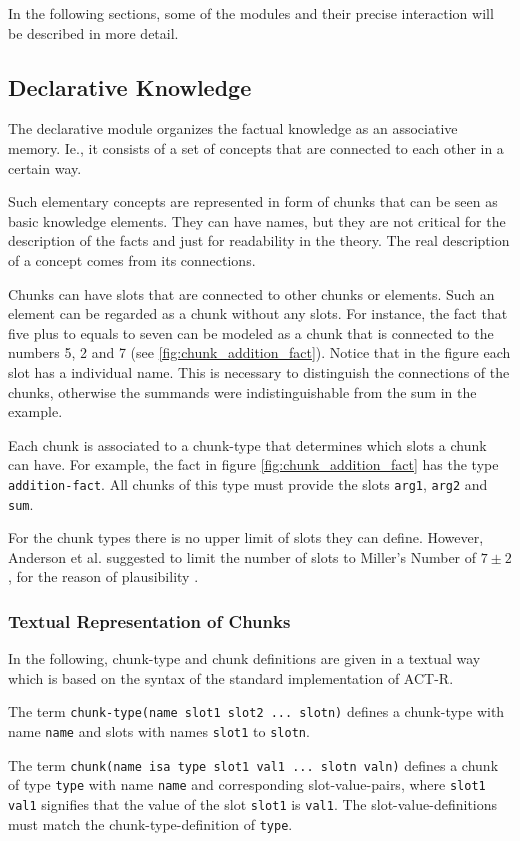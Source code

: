 In the following sections, some of the modules and their precise interaction will be described in more detail.

\subsection{Declarative Knowledge}

The declarative module organizes the factual knowledge as an associative memory. Ie., it consists of a set of concepts that are connected to each other in a certain way.

Such elementary concepts are represented in form of chunks that can be seen as basic knowledge elements. They can have names, but they are not critical for the description of the facts and just for readability in the theory. The real description of a concept comes from its connections.

Chunks can have slots that are connected to other chunks or elements. Such an element can be regarded as a chunk without any slots. For instance, the fact that five plus to equals to seven can be modeled as a chunk that is connected to the numbers 5, 2 and 7 (see \ref{fig:chunk_addition_fact}). Notice that in the figure each slot has a individual name. This is necessary to distinguish the connections of the chunks, otherwise the summands were indistinguishable from the sum in the example.

Each chunk is associated to a chunk-type that determines which slots a chunk can have. For example, the fact in figure \ref{fig:chunk_addition_fact} has the type \verb|addition-fact|. All chunks of this type must provide the slots \verb|arg1|, \verb|arg2| and \verb|sum|.

For the chunk types there is no upper limit of slots they can define. However, Anderson et al. suggested to limit the number of slots to Miller's Number of $7 \pm 2$, for the reason of plausibility \cite{unknown}. 

\subsubsection{Textual Representation of Chunks}

In the following, chunk-type and chunk definitions are given in a textual way which is based on the syntax of the standard implementation of ACT-R.

\begin{definition}
The term \verb|chunk-type(name slot1 slot2 ... slotn)| defines a chunk-type with name \verb|name| and slots with names \verb|slot1| to \verb|slotn|.

The term \verb|chunk(name isa type slot1 val1 ... slotn valn)| defines a chunk of type \verb|type| with name \verb|name| and corresponding slot-value-pairs, where \verb|slot1 val1| signifies that the value of the slot \verb|slot1| is \verb|val1|. The slot-value-definitions must match the chunk-type-definition of \verb|type|.
\end{definition}

